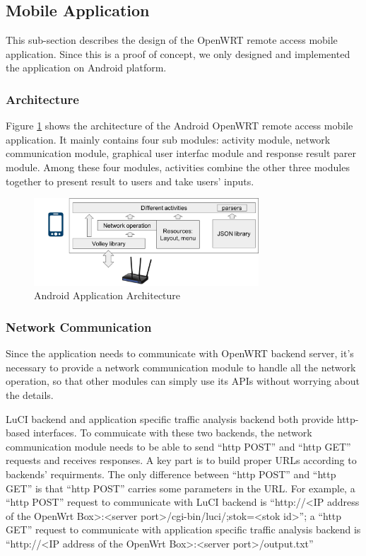 \subsection{Mobile Application}
This sub-section describes the design of the OpenWRT remote access mobile application. Since this is a proof of concept, we only designed and implemented the application on Android platform.

\subsubsection{Architecture}
Figure \ref{android-architecture} shows the architecture of the Android OpenWRT remote access mobile application. It mainly contains four sub modules: activity module, network communication module, graphical user interfac module and response result parer module. Among these four modules, activities combine the other three modules together to present result to users and take users' inputs.
	\begin{figure}
		\centering
		\includegraphics[width=0.75\textwidth]{android-architecture.png}
		\caption{Android Application Architecture}
		\label{android-architecture}
	\end{figure}

\subsubsection{Network Communication}
Since the application needs to communicate with OpenWRT backend server, it's necessary to provide a network communication module to handle all the network operation, so that other modules can simply use its APIs without worrying about the details.

LuCI backend and application specific traffic analysis backend both provide http-based interfaces. To commuicate with these two backends, the network communication module needs to be able to send ``http POST'' and ``http GET'' requests and receives responses. A key part is to build proper URLs according to backends' requirments. The only difference between ``http POST'' and ``http GET'' is that ``http POST'' carries some parameters in the URL. For example, a ``http POST'' request to communicate with LuCI backend is ``http://<IP address of the OpenWrt Box>:<server port>/cgi-bin/luci/;stok=<stok id>''; a ``http GET'' request to communicate with application specific traffic analysis backend is ``http://<IP address of the OpenWrt Box>:<server port>/output.txt''

